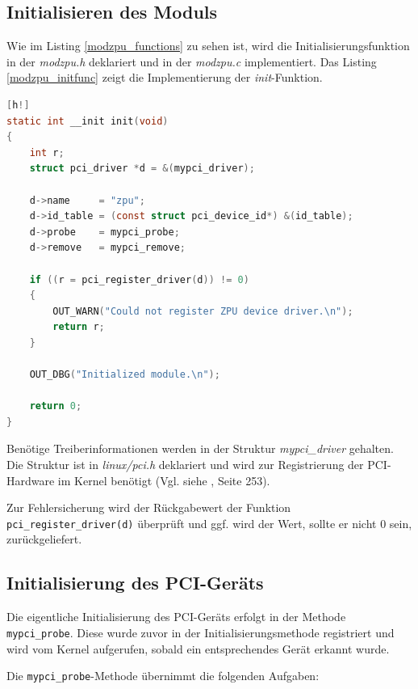 \documentclass[11pt]{scrartcl}
\begin{document}
\subsection{Initialisieren des Moduls}

Wie im Listing \ref{modzpu_functions} zu sehen ist, wird die Initialisierungsfunktion in der \textit{modzpu.h} deklariert und in der \textit{modzpu.c} implementiert. Das Listing \ref{modzpu_initfunc} zeigt die Implementierung der \textit{init}-Funktion.

\begin{lstlisting}[language=C, firstnumber=67, label=modzpu_initfunc, caption=modzpu Init-Funktion][h!]
static int __init init(void)
{
	int r;
	struct pci_driver *d = &(mypci_driver);

	d->name     = "zpu";
	d->id_table = (const struct pci_device_id*) &(id_table);
	d->probe    = mypci_probe;
	d->remove   = mypci_remove;

	if ((r = pci_register_driver(d)) != 0)
	{
		OUT_WARN("Could not register ZPU device driver.\n");
		return r;
	}

	OUT_DBG("Initialized module.\n");

	return 0;
}
\end{lstlisting}

Benötige Treiberinformationen werden in der Struktur \textit{mypci\_driver} gehalten. Die Struktur ist in \textit{linux/pci.h} deklariert und wird zur Registrierung der PCI-Hardware im Kernel benötigt (Vgl. siehe \cite{script_hwstp}, Seite 253).
 
Zur Fehlersicherung wird der Rückgabewert der Funktion \texttt{pci\_register\_driver(d)} überprüft und ggf. wird der Wert, sollte er nicht 0 sein, zurückgeliefert. 

\subsection{Initialisierung des PCI-Geräts}

Die eigentliche Initialisierung des PCI-Geräts erfolgt in der Methode \texttt{mypci\_probe}. Diese wurde zuvor in der Initialisierungsmethode registriert und wird vom Kernel aufgerufen, sobald ein entsprechendes Gerät erkannt wurde.

Die \texttt{mypci\_probe}-Methode übernimmt die folgenden Aufgaben:
\end{document}
